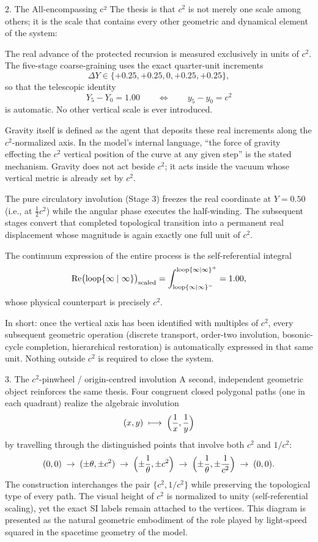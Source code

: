 2. The All-encompassing c²
The thesis is that \(c^2\) is not merely one scale among others; it is the scale that contains every other geometric and dynamical element of the system:

The real advance of the protected recursion is measured exclusively in units of \(c^2\).  
  The five-stage coarse-graining uses the exact quarter-unit increments
  \[
  \Delta Y \in \{+0.25,+0.25,0,+0.25,+0.25\},
  \]
  so that the telescopic identity
  \[
  Y_5 - Y_0 = 1.00 \qquad\Longleftrightarrow\qquad y_5 - y_0 = c^2
  \]
  is automatic. No other vertical scale is ever introduced.

Gravity itself is defined as the agent that deposits these real increments along the \(c^2\)-normalized axis. In the model’s internal language, “the force of gravity effecting the \(c^2\) vertical position of the curve at any given step” is the stated mechanism. Gravity does not act beside \(c^2\); it acts inside the vacuum whose vertical metric is already set by \(c^2\).

The pure circulatory involution (Stage 3) freezes the real coordinate at \(Y = 0.50\) (i.e., at \(\frac12 c^2\)) while the angular phase executes the half-winding. The subsequent stages convert that completed topological transition into a permanent real displacement whose magnitude is again exactly one full unit of \(c^2\).

The continuum expression of the entire process is the self-referential integral
  \[
  \operatorname{Re}\bigl(\operatorname{loop}\{\infty\mid\infty\}\bigr)_{\rm scaled}
  = \int_{\operatorname{loop}\{\infty\mid\infty\}^{-}}^{\operatorname{loop}\{\infty\mid\infty\}^{+}} = 1.00,
  \]
  whose physical counterpart is precisely \(c^2\).

In short: once the vertical axis has been identified with multiples of \(c^2\), every subsequent geometric operation (discrete transport, order-two involution, bosonic-cycle completion, hierarchical restoration) is automatically expressed in that same unit. Nothing outside \(c^2\) is required to close the system.

3. The \(c^2\)-pinwheel / origin-centred involution
A second, independent geometric object reinforces the same thesis. Four congruent closed polygonal paths (one in each quadrant) realize the algebraic involution
\[
(x,y)\;\longmapsto\;\Bigl(\frac1x,\frac1y\Bigr)
\]
by travelling through the distinguished points that involve both \(c^2\) and \(1/c^2\):
\[
(0,0)\;\to\;(\pm\theta,\pm c^2)\;\to\;\Bigl(\pm\frac1\theta,\pm c^2\Bigr)\;\to\;\Bigl(\pm\frac1\theta,\pm\frac1{c^2}\Bigr)\;\to\;(0,0).
\]
The construction interchanges the pair \(\{c^2,1/c^2\}\) while preserving the topological type of every path. The visual height of \(c^2\) is normalized to unity (self-referential scaling), yet the exact SI labels remain attached to the vertices. This diagram is presented as the natural geometric embodiment of the role played by light-speed squared in the spacetime geometry of the model.

